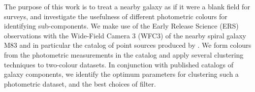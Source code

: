 The purpose of this work is to treat a nearby galaxy as if it were a blank field for surveys, and investigate the
usefulness of different photometric colours for identifying sub-components.
We make use of the Early Release Science (ERS) observations with the Wide-Field Camera 3 (WFC3) of the nearby spiral galaxy M83 \citep{}
and in particular the catalog of point sources produced by \citet{}.
We form colours from the photometric measurements in the catalog and apply several clustering techniques to two-colour datasets.
In conjunction with published catalogs of galaxy components, we identify the optimum parameters for clustering such a photometric dataset,
and the best choices of filter.




%
%
